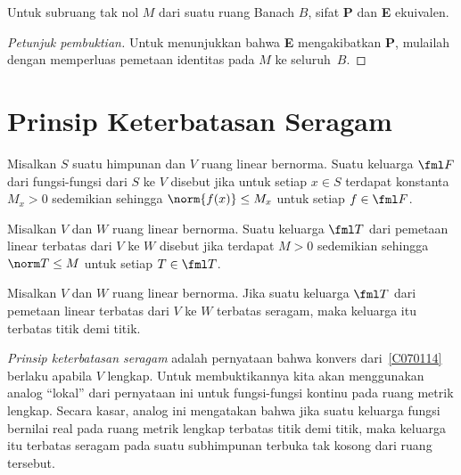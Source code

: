 \begin{prop} Untuk subruang tak nol $M$ dari suatu ruang Banach $B$, sifat \textbf{P} dan \textbf{E} ekuivalen.
\end{prop}

\begin{proof}[\emph{Petunjuk pembuktian}] Untuk menunjukkan bahwa \textbf{E} mengakibatkan \textbf{P}, mulailah dengan memperluas pemetaan identitas
pada $M$ ke seluruh~$B$.   \ns
\end{proof}

















\section{Prinsip Keterbatasan Seragam}
\begin{defn} Misalkan $S$ suatu himpunan dan $V$ ruang linear bernorma. Suatu keluarga $\fml F$ dari
fungsi-fungsi dari $S$ ke $V$ disebut
 jika untuk setiap $x \in S$ terdapat konstanta $M_x > 0$ sedemikian sehingga
$\norm{f(x)} \le M_x$ untuk setiap $f \in \fml F$.
\end{defn}

\begin{defn} Misalkan $V$ dan $W$ ruang linear bernorma. Suatu keluarga $\fml T$ dari pemetaan linear terbatas
dari $V$ ke $W$ disebut
 jika terdapat $M > 0$ sedemikian sehingga $\norm T \le M$ untuk setiap $T \in
\fml T$.
\end{defn}

\begin{exer}\label{C070114} Misalkan $V$ dan $W$ ruang linear bernorma. Jika suatu keluarga $\fml T$ dari
pemetaan linear terbatas dari $V$ ke $W$ terbatas seragam, maka keluarga itu terbatas titik demi titik.
\end{exer}

\emph{Prinsip keterbatasan seragam} adalah pernyataan bahwa konvers
dari~\ref{C070114} berlaku apabila $V$ lengkap. Untuk membuktikannya kita akan menggunakan
analog ``lokal'' dari pernyataan ini untuk fungsi-fungsi kontinu pada ruang metrik lengkap. Secara kasar, analog ini mengatakan bahwa jika
suatu keluarga fungsi bernilai real pada ruang metrik lengkap terbatas titik demi titik, maka keluarga itu terbatas
seragam pada suatu subhimpunan terbuka tak kosong dari ruang tersebut.

